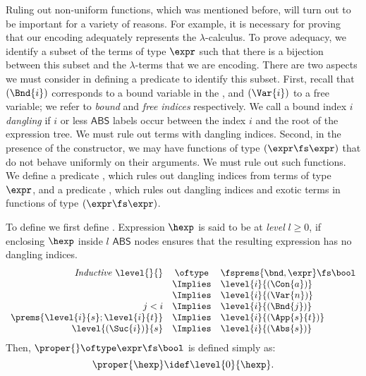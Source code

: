 \documentclass[final]{svjour3}
\begin{document}
Ruling out non-uniform functions, which was mentioned before, will
turn out to be important for a variety of reasons.  For example, it is
necessary for proving that our encoding adequately represents the
$\lambda$-calculus.  To prove adequacy, we identify a subset of the
terms of type $\expr$ such that there is a bijection between this
subset and the $\lambda$-terms that we are encoding.  There are two
aspects we must consider in defining a predicate to identify this
subset.  First, recall that $(\Bnd{i})$ corresponds to a bound variable
in the \lcalc, and $(\Var{i})$ to a free variable; we refer to
\emph{bound} and \emph{free} \emph{indices} respectively. We call a
bound index $i$ \emph{dangling} if $i$ or less $\mathsf{ABS}$ labels
occur between the index $i$ and the root of the expression tree.  We
must rule out terms with dangling indices.  Second, in the presence of
the  constructor, we may have functions of type
$(\expr\fs\expr)$ that do not behave uniformly on their arguments.  We
must rule out such functions.  We define a predicate ,
which rules out dangling indices from terms of type $\expr$, and a
predicate , which rules out dangling indices and exotic
terms in functions of type $(\expr\fs\expr)$.

To define  we first define .  Expression
$\hexp$ is said to be at \emph{level} $l\geq0$, if enclosing $\hexp$
inside $l$ $\mathsf{ABS}$ nodes ensures that the resulting expression
has no dangling indices.
 \[
 \begin{array}{rcl}
 \mathit{Inductive}\ \level{}{} &\oftype &\fsprems{\bnd,\expr} \fs \bool\\
   & \Implies & \level{i}{(\Con{a})} \\
   & \Implies & \level{i}{(\Var{n})} \\
   j < i  & \Implies & 
   \level{i}{(\Bnd{j})} \\
   \prems{\level{i}{s} ; \level{i}{t}} & \Implies &  
   \level{i}{(\App{s}{t})}\\ 
   \level{(\Suc{i})}{s} & \Implies & 
   \level{i}{(\Abs{s})}
 \end{array}
 \]
Then, $\proper{} \oftype \expr \fs \bool$ is defined simply as:
$$\proper{\hexp} \idef \level{0}{\hexp}.$$
\end{document}
